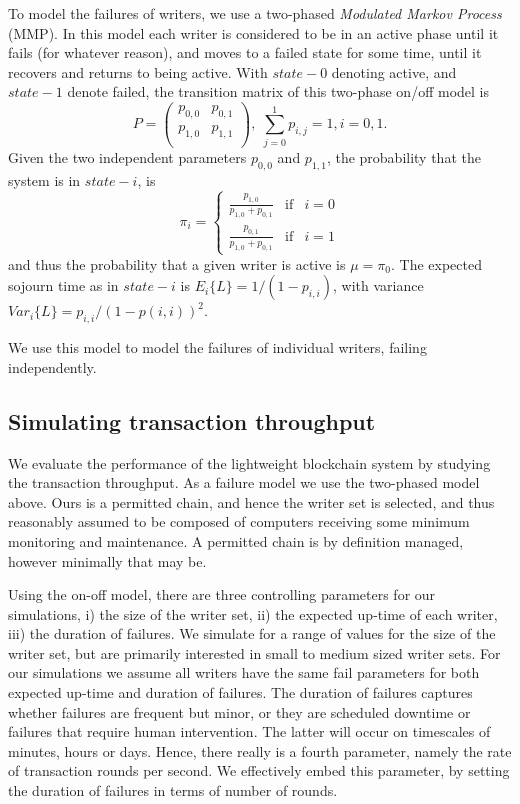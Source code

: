 \documentclass[10pt]{article}
\begin{document}
To model the failures of writers, we use a two-phased \emph{Modulated Markov Process} (MMP). In this model each writer is considered to be in an active phase until it fails (for whatever reason), and moves to a failed state for some time, until it recovers and returns to being active. With $state-0$ denoting active, and $state-1$ denote failed, the transition matrix of this two-phase on/off model is
\[
P = 
\begin{pmatrix}
    p_{0,0} & p_{0,1} \\
    p_{1,0} & p_{1,1} \\
\end{pmatrix}
 , \;
\sum_{j=0}^{1} p_{i,j} = 1, i = 0,1.
\]
Given the two independent parameters $p_{0,0}$ and $p_{1,1}$, the probability that the system is in $state-i$, is 
\[
\pi_i = \left\{
\begin{matrix} 
\frac{p_{1,0}}{p_{1,0}+p_{0,1}} & \text{if} & i=0\\
\frac{p_{0,1}}{p_{1,0}+p_{0,1}} & \text{if} & i=1
\end{matrix}
\right.
\]
and thus the probability that a given writer is active is $\mu = \pi_0$. The expected sojourn time as in $state-i$ is $E_i\{L\} = 1/(1-p_{i,i})$, with variance $Var_i\{L\} = p_{i,i}/(1-p(i,i))^2.$

We use this model to model the failures of individual writers, failing independently.

\subsection{Simulating transaction throughput}
We evaluate the performance of the lightweight blockchain system by studying the transaction throughput. As a failure model we use the two-phased model above. Ours is a permitted chain, and hence the writer set is selected, and thus reasonably assumed to be composed of computers receiving some minimum monitoring and maintenance. A permitted chain is by definition managed, however minimally that may be. %

Using the on-off model, there are three controlling parameters for our simulations, i) the size of the writer set, ii) the expected up-time of each writer, iii) the duration of failures. We simulate for a range of values for the size of the writer set, but are primarily interested in small to medium sized writer sets. For our simulations we assume all writers have the same fail parameters for both expected up-time and duration of failures. The duration of failures captures whether failures are frequent but minor, or they are scheduled downtime or failures that require human intervention. The latter will occur on timescales of minutes, hours or days. Hence, there really is a fourth parameter, namely the rate of transaction rounds per second. We effectively embed this parameter, by setting the duration of failures in terms of number of rounds.
\end{document}

